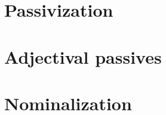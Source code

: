 \label{chap:passn}
\section{Passivization} \label{passn:pass}


\section{Adjectival passives} \label{passn:adjpass}


\section{Nominalization} \label{passn:n}

